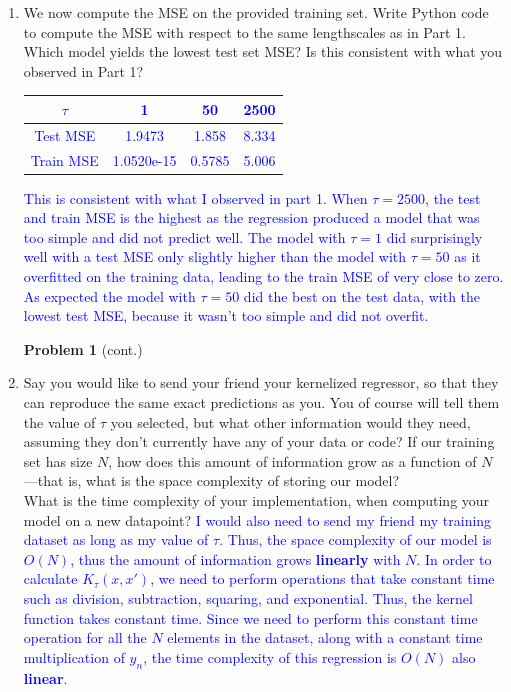 \documentclass[submit]{harvardml}
\begin{document}
\begin{framed}
\begin{enumerate}
\item We now compute the MSE on the provided training set. Write Python code to compute the MSE with respect to the same lengthscales as in Part 1. Which model yields the lowest test set MSE? Is this consistent with what you observed in Part 1?\\
\textcolor{blue}{
\begin{center}
\begin{tabular}{ |c|c|c|c| } 
 \hline
 $\tau$ & 1 & 50 & 2500 \\ 
 \hline
 Test MSE & 1.9473 & 1.858 & 8.334 \\ 
 \hline
 Train MSE & 1.0520e-15 & 0.5785 & 5.006\\
 \hline
\end{tabular}
\label{Train MSE}
\end{center}
This is consistent with what I observed in part 1. When $\tau = 2500$, the test and train MSE is the highest as the regression produced a model that was too simple and did not predict well. The model with $\tau = 1$ did surprisingly well with a test MSE only slightly higher than the model with $\tau =50$ as it overfitted on the training data, leading to the train MSE of very close to zero. As expected the model with $\tau =50$ did the best on the test data, with the lowest test MSE, because it wasn't too simple and did not overfit.
}
\newpage
\noindent\textbf{Problem 1} (cont.)
\item 
Say you would like to send your friend your kernelized regressor, so that they can reproduce the same exact predictions as you. You of course will tell them the value of $\tau$ you selected, but what other information would they need, assuming they don't currently have any of your data or code? If our training set has size $N$, how does this amount of information grow as a function of $N$—that is, what is the space complexity of storing our model?\\
What is the time complexity of your implementation, when computing your model on a new datapoint? 
\textcolor{blue}{
I would also need to send my friend my training dataset as long as my value of $\tau$. Thus, the space complexity of our model is $O(N)$, thus the amount of information grows \textbf{linearly} with $N$. In order to calculate $K_\tau(x,x')$, we need to perform operations that take constant time such as division, subtraction, squaring, and exponential. Thus, the kernel function takes constant time. Since we need to perform this constant time operation for all the $N$ elements in the dataset, along with a constant time multiplication of $y_{n}$, the time complexity of this regression is $O(N)$ also \textbf{linear}.
}
\end{enumerate}
\end{framed}
\end{document}
